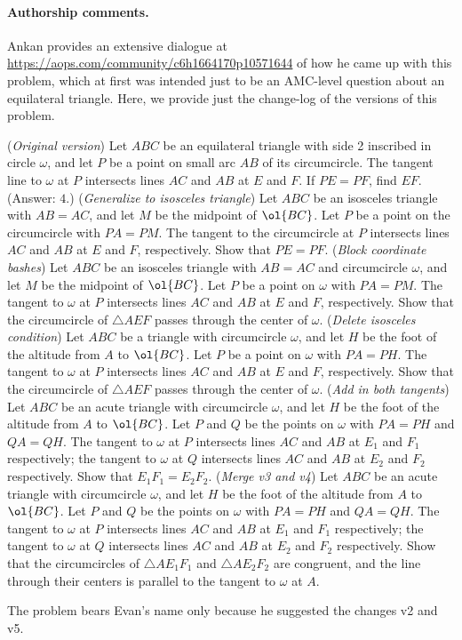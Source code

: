 \paragraph{Authorship comments.}
Ankan provides an extensive
dialogue at \url{https://aops.com/community/c6h1664170p10571644}
of how he came up with this problem,
which at first was intended just to be an AMC-level question
about an equilateral triangle.
Here, we provide just the change-log of the versions of this problem.
\begin{enumerate}
  \ii[0.] (\emph{Original version}) Let $ABC$ be an equilateral triangle with side 2 inscribed in circle $\omega$, and let $P$ be a point on small arc $AB$ of its circumcircle. The tangent line to $\omega$ at $P$ intersects lines $AC$ and $AB$ at $E$ and $F$. If $PE = PF$, find $EF$.
  (Answer: $4$.)
  \ii (\emph{Generalize to isosceles triangle}) Let $ABC$ be an isosceles triangle with $AB = AC$, and let $M$ be the midpoint of $\ol{BC}$. Let $P$ be a point on the circumcircle with $PA = PM$. The tangent to the circumcircle at $P$ intersects lines $AC$ and $AB$ at $E$ and $F$, respectively. Show that $PE = PF$.
  \ii (\emph{Block coordinate bashes}) Let $ABC$ be an isosceles triangle with $AB = AC$ and circumcircle $\omega$, and let $M$ be the midpoint of $\ol{BC}$. Let $P$ be a point on $\omega$ with $PA = PM$. The tangent to $\omega$ at $P$ intersects lines $AC$ and $AB$ at $E$ and $F$, respectively. Show that the circumcircle of $\triangle AEF$ passes through the center of $\omega$.
  \ii (\emph{Delete isosceles condition}) Let $ABC$ be a triangle with circumcircle $\omega$, and let $H$ be the foot of the altitude from $A$ to $\ol{BC}$. Let $P$ be a point on $\omega$ with $PA = PH$. The tangent to $\omega$ at $P$ intersects lines $AC$ and $AB$ at $E$ and $F$, respectively. Show that the circumcircle of $\triangle AEF$ passes through the center of $\omega$.
  \ii (\emph{Add in both tangents}) Let $ABC$ be an acute triangle with circumcircle $\omega$, and let $H$ be the foot of the altitude from $A$ to $\ol{BC}$. Let $P$ and $Q$ be the points on $\omega$ with $PA = PH$ and $QA = QH$. The tangent to $\omega$ at $P$ intersects lines $AC$ and $AB$ at $E_1$ and $F_1$ respectively; the tangent to $\omega$ at $Q$ intersects lines $AC$ and $AB$ at $E_2$ and $F_2$ respectively. Show that $E_1F_1 = E_2F_2$.
  \ii (\emph{Merge v3 and v4}) Let $ABC$ be an acute triangle with circumcircle $\omega$, and let $H$ be the foot of the altitude from $A$ to $\ol{BC}$. Let $P$ and $Q$ be the points on $\omega$ with $PA = PH$ and $QA = QH$. The tangent to $\omega$ at $P$ intersects lines $AC$ and $AB$ at $E_1$ and $F_1$ respectively; the tangent to $\omega$ at $Q$ intersects lines $AC$ and $AB$ at $E_2$ and $F_2$ respectively. Show that the circumcircles of $\triangle AE_1F_1$ and $\triangle AE_2F_2$ are congruent, and the line through their centers is parallel to the tangent to $\omega$ at $A$.
\end{enumerate}
The problem bears Evan's name only because he suggested the changes v2 and v5.
